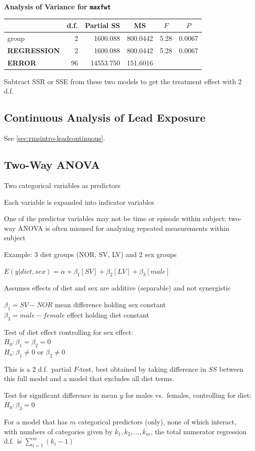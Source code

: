 \textbf{\Needspace{2in}
Analysis of Variance for \texttt{\smaller maxfwt}}\begin{center}
\begin{tabular}{lrrrrr}
\hline\hline
\multicolumn{1}{l}{}&\multicolumn{1}{c}{d.f.}&\multicolumn{1}{c}{Partial SS}&\multicolumn{1}{c}{MS}&\multicolumn{1}{c}{$F$}&\multicolumn{1}{c}{$P$}\tabularnewline
\hline
group& 2& 1600.088&800.0442&5.28&0.0067\tabularnewline
\textbf{REGRESSION}& 2& 1600.088&800.0442&5.28&0.0067\tabularnewline
\textbf{ERROR}&96&14553.750&151.6016&&\tabularnewline
\hline
\end{tabular}\end{center}

Subtract SSR or SSE from these two models to get the treatment effect with 2 d.f.
\ei

\subsection{Continuous Analysis of Lead Exposure}
See \ref{sec:rmsintro-leadcontinuous}.

\subsection{Two-Way ANOVA} 
\bi
\item Two categorical variables as predictors
\item Each variable is expanded into indicator variables
\item One of the predictor variables may not be time or episode within
  subject; two-way ANOVA is often misused for analyzing repeated
  measurements within subject
\item Example: 3 diet groups (NOR, SV, LV) and 2 sex groups
\item $E(y|diet,sex) = \alpha + \beta_{1}[SV] + \beta_{2}[LV] +
  \beta_{3}[male]$
\item Assumes effects of diet and sex are additive (separable) and not
  synergistic
\item $\beta_{1} = SV - NOR$ mean difference holding sex constant \\
  $\beta_{3} = male - female$ effect holding diet constant
\item Test of diet effect controlling for sex effect: \\
 $H_{0}:\beta_{1}=\beta_{2}=0$ \\
 $H_{a}: \beta_{1} \neq 0$ or $\beta_{2} \neq 0$
\item This is a 2 d.f.\ partial $F$-test, best obtained by taking
  difference in $SS$ between this full model and a model that excludes
  all diet terms.
\item Test for significant difference in mean $y$ for males vs.\
  females, controlling for diet: \\
 $H_{0}: \beta_{3} = 0$
\item For a model that has $m$ categorical predictors (only), none of
  which interact, with numbers of categories given by $k_{1}, k_{2},
  \ldots, k_{m}$, the total numerator regression d.f.\ is
  $\sum_{i=1}^{m}(k_{i}-1)$
\ei

